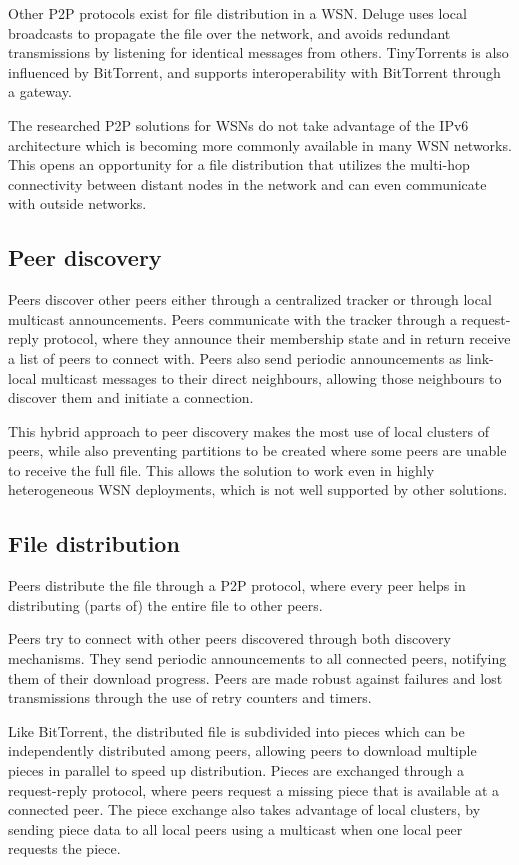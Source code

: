Other \gls{P2P} protocols exist for file distribution in a \gls{WSN}. Deluge uses local broadcasts to propagate the file over the network, and avoids redundant transmissions by listening for identical messages from others. TinyTorrents is also influenced by BitTorrent, and supports interoperability with BitTorrent through a gateway.

The researched \gls{P2P} solutions for \glspl{WSN} do not take advantage of the \gls{IPv6} architecture which is becoming more commonly available in many \gls{WSN} networks. This opens an opportunity for a file distribution that utilizes the multi-hop connectivity between distant nodes in the network and can even communicate with outside networks. 

\subsection{Peer discovery}
Peers discover other peers either through a centralized tracker or through local multicast announcements. Peers communicate with the tracker through a request-reply protocol, where they announce their membership state and in return receive a list of peers to connect with. Peers also send periodic announcements as link-local multicast messages to their direct neighbours, allowing those neighbours to discover them and initiate a connection.

This hybrid approach to peer discovery makes the most use of local clusters of peers, while also preventing partitions to be created where some peers are unable to receive the full file. This allows the solution to work even in highly heterogeneous \gls{WSN} deployments, which is not well supported by other solutions.

\subsection{File distribution}
Peers distribute the file through a \gls{P2P} protocol, where every peer helps in distributing (parts of) the entire file to other peers.

Peers try to connect with other peers discovered through both discovery mechanisms. They send periodic announcements to all connected peers, notifying them of their download progress. Peers are made robust against failures and lost transmissions through the use of retry counters and timers.

Like BitTorrent, the distributed file is subdivided into pieces which can be independently distributed among peers, allowing peers to download multiple pieces in parallel to speed up distribution. Pieces are exchanged through a request-reply protocol, where peers request a missing piece that is available at a connected peer. The piece exchange also takes advantage of local clusters, by sending piece data to all local peers using a multicast when one local peer requests the piece.

